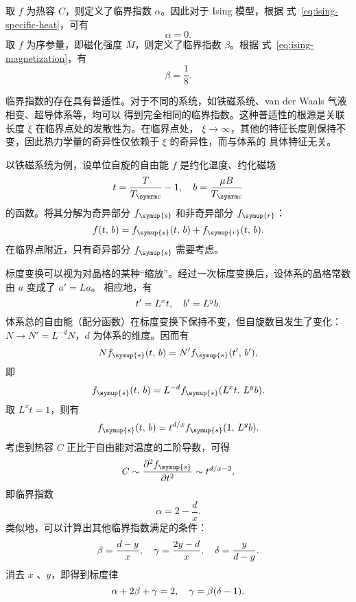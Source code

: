 取 $f$ 为热容 $C$，则定义了临界指数 $\alpha$。因此对于 Ising 模型，根据
式~\eqref{eq:ising-specific-heat}，可有
\begin{equation}
  \alpha = 0.
\end{equation}
取 $f$ 为序参量，即磁化强度 $\bar{M}$，则定义了临界指数 $\beta$。根据
式~\eqref{eq:ising-magnetization}，有
\begin{equation}
  \beta = \frac{1}{8}.
\end{equation}

临界指数的存在具有普适性。对于不同的系统，如铁磁系统、van der Waals 气液相变、超导体系等，均可以
得到完全相同的临界指数。这种普适性的根源是关联长度 $\xi$ 在临界点处的发散性为。在临界点处，
$\xi\to\infty$，其他的特征长度则保持不变，因此热力学量的奇异性仅依赖于 $\xi$ 的奇异性，而与体系的
具体特征无关。

以铁磁系统为例，设单位自旋的自由能 $f$ 是约化温度、约化磁场
\begin{equation}
  t = \frac{T}{\Tc} - 1 \qc
  b = \frac{\mu B}{\Tc}
\end{equation}
的函数。将其分解为奇异部分 $f_{\symup{s}}$ 和非奇异部分 $f_{\symup{r}}$：
\begin{equation}
  f(t,\,b) = f_{\symup{s}}(t,\,b) + f_{\symup{r}}(t,\,b).
\end{equation}
在临界点附近，只有奇异部分 $f_{\symup{s}}$ 需要考虑。

标度变换可以视为对晶格的某种“缩放”。经过一次标度变换后，设体系的晶格常数由 $a$ 变成了 $a'=La$。
相应地，有
\begin{equation}
  \label{eq:transform-relation-t-b}
  t' = L^x t \qc b' = L^y b.
\end{equation}
体系总的自由能（配分函数）在标度变换下保持不变，但自旋数目发生了变化：$N \to N'=L^{-d} N$，$d$
为体系的维度。因而有
\begin{equation}
  N f_{\symup{s}} (t,\,b) = N' f_{\symup{s}} (t',\,b'),
\end{equation}
即
\begin{equation}
  f_{\symup{s}} (t,\,b) = L^{-d} f_{\symup{s}} (L^x t, \, L^y b).
\end{equation}
取 $L^x t=1$，则有
\begin{equation}
  f_{\symup{s}} (t,\,b) = t^{d/x} f_{\symup{s}} (1, \, L^y b).
\end{equation}
考虑到热容 $C$ 正比于自由能对温度的二阶导数，可得
\begin{equation}
  C \sim \pdv[2]{f_{\symup{s}}}{t} \sim t^{d/x-2},
\end{equation}
即临界指数
\begin{equation}
  \alpha = 2 - \frac{d}{x}.
\end{equation}
类似地，可以计算出其他临界指数满足的条件：
\begin{equation}
  \beta  = \frac{d-y}{x}  \qc
  \gamma = \frac{2y-d}{x} \qc
  \delta = \frac{y}{d-y}.
\end{equation}
消去 $x$ 、$y$，即得到标度律
\begin{equation}
  \label{eq:scaling-relation-i-ii}
  \alpha + 2\beta + \gamma = 2 \qc
  \gamma = \beta (\delta - 1).
\end{equation}

